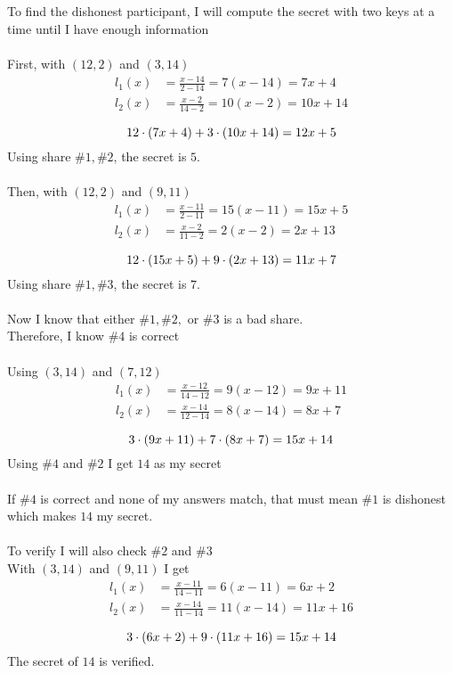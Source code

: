 \documentclass{article}
\begin{document}
\section{}
To find the dishonest participant, I will compute the secret with two keys at 
a time until I have enough information
\\
\\
First, with $(12, 2)$ and $(3, 14)$
\[
\begin{split}
l_1(x) &= \frac{x-14}{2-14} = 7(x-14) = 7x+4 \\
l_2(x) &= \frac{x-2}{14-2} = 10(x-2) = 10x+14 \\
\end{split}
\]
\[
12\cdot (7x+4) + 3 \cdot (10x+14) = 12x+5 \\
\]
Using share $\#1, \#2$, the secret is $5$.
\\
\\
Then, with $(12, 2)$ and $(9, 11)$
\[
\begin{split}
l_1(x) &= \frac{x-11}{2-11} = 15(x-11) = 15x+5 \\
l_2(x) &= \frac{x-2}{11-2} = 2(x-2) = 2x+13 \\
\end{split}
\]
\[
12\cdot (15x+5) + 9 \cdot (2x+13) = 11x+7 \\
\]
Using share $\#1, \#3$, the secret is $7$.
\\
\\
Now I know that either $\#1, \#2,$ or $\#3$ is a bad share.
\\
Therefore, I know $\#4$ is correct
\\
\\
Using $(3, 14)$ and $(7, 12)$
\[
\begin{split}
l_1(x) &= \frac{x-12}{14-12} = 9(x-12) = 9x+11\\
l_2(x) &= \frac{x-14}{12-14} = 8(x-14) = 8x+7\\
\end{split}
\]
\[
3\cdot (9x+11) + 7 \cdot (8x+7) = 15x+14 \\
\]
Using $\#4$ and $\#2$ I get $14$ as my secret
\\
\\
If $\#4$ is correct and none of my answers match, that must mean $\#1$ is dishonest
which makes $14$ my secret.
\\
\\
To verify I will also check $\#2$ and $\#3$
\\
With $(3, 14)$ and $(9, 11)$ I get
\[
\begin{split}
l_1(x) &= \frac{x-11}{14-11} = 6(x-11) = 6x+2\\
l_2(x) &= \frac{x-14}{11-14} = 11(x-14) = 11x+16\\
\end{split}
\]
\[
3\cdot (6x+2) + 9 \cdot (11x+16) = 15x +  14\\
\]
The secret of $14$ is verified.
\end{document}
